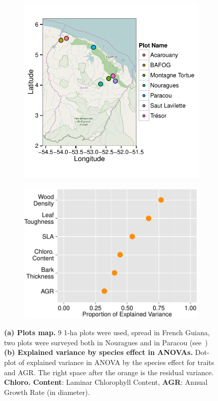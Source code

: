 \begin{figure}[!ht]
	\centering
	\begin{subfigure}[c]{0.45\textwidth}
		\includegraphics[scale=0.75]{figures/Plots_Map_2015-05-26.pdf}
		\caption{}
		\label{fig:map}
	\end{subfigure}
	\begin{subfigure}[c]{0.5\textwidth}
		\includegraphics[scale=0.7]{figures/Aov_Var_Traits_2015-05-25.pdf}
		\caption{}
		\label{fig:aov}
	\end{subfigure}
	\caption{\textbf{(a) Plots map.} 9 1-ha plots were used, spread in French Guiana, two plots were surveyed both in Nouragues and in Paracou (see~\citealp{baraloto_decoupled_2010}) \textbf{(b) Explained variance by species effect in ANOVAs.} Dot-plot of explained variance in ANOVA by the species effect for traits and AGR. The right space after the orange is the residual variance. \textbf{Chloro. Content}: Laminar Chlorophyll Content, \textbf{AGR}: Annual Growth Rate (in diameter).}
	\label{fig:gen}
\end{figure}


